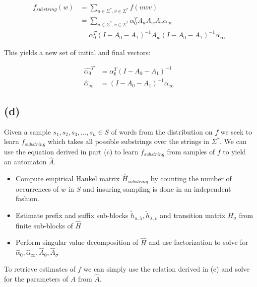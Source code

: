 \documentclass[11pt]{amsart}
\begin{document}
\begin{equation}
\begin{aligned}
f_{substring} (w)  &= \sum_{u \in \Sigma^*, v \in \Sigma^*} f(uwv) \\
			 &=  \sum_{u \in \Sigma^*, v \in \Sigma^*} \alpha_0^T A_u A_w A_v \alpha_{\infty} \\
			 &=   \alpha_0^T (I - A_0 - A_1)^{-1}  A_w (I - A_0 - A_1)^{-1}  \alpha_{\infty}
\end{aligned}
\end{equation}

This yields a new set of initial and final vectors:

\begin{equation}
\begin{aligned}
\hat{\alpha_0}^T &= \alpha_0^T (I - A_0 - A_1)^{-1} \\
\hat{\alpha}_{\infty} &= (I - A_0 - A_1)^{-1} \alpha_{\infty}
\end{aligned}
\end{equation}

\subsection{(d)}

Given a sample $s_1, s_2, s_3, ..., s_n \in S$ of words from the distribution on $f$ we seek to learn $f_{substring}$ which takes all possible substrings over the strings in $\Sigma^*$. We can use the equation derived in part (c) to learn $f_{substring}$ from samples of $f$ to yield an automaton $\hat{A}$. 

\begin{itemize}
\item Compute empirical Hankel matrix $\hat{H}_{substring}$ by counting the number of occurrences of $w$ in $S$ and insuring sampling is done in an independent fashion.
\item Estimate prefix and suffix sub-blocks $\tilde{h}_{u, \lambda}, \tilde{h}_{\lambda, v}$ and transition matrix $H_{\sigma}$ from finite sub-blocks of $\hat{H}$
\item Perform singular value decomposition of $\hat{H}$ and use factorization to solve for $\hat{\alpha}_{0}, \hat{\alpha}_{\infty}, \hat{A}_0, \hat{A}_{\sigma}$
\end{itemize}

To retrieve estimates of $f$ we can simply use the relation derived in (c) and solve for the parameters of $A$ from $\hat{A}$.
\end{document}

